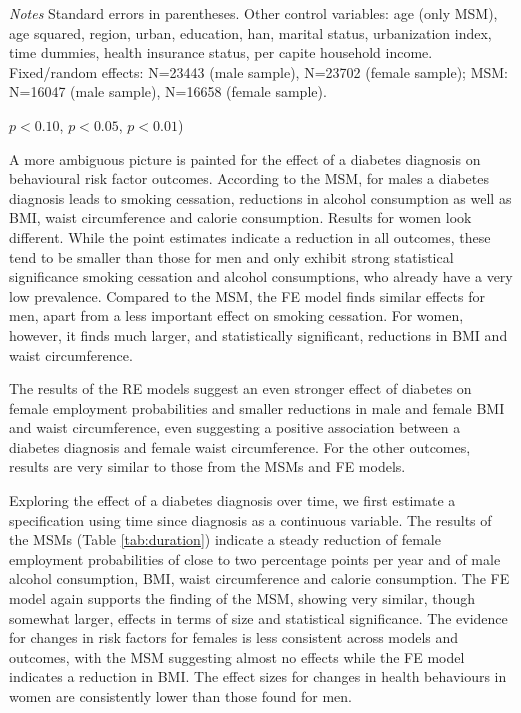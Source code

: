 \begin{table}[p]
\begin{adjustbox}{max width=\linewidth, center}
\begin{threeparttable}
{\begin{tabular}{l*{6}{S
S}}
\bottomrule
\end{tabular}
\begin{tablenotes}
\item \textit{Notes} Standard errors in parentheses. Other control variables: age (only MSM), age squared, region, urban, education, han, marital status, urbanization index, time dummies, health insurance status, per capite household income.  Fixed/random effects: N=23443 (male sample), N=23702 (female sample); MSM:  N=16047 (male sample), N=16658 (female sample).
\item \sym{*} \(p<0.10\), \sym{**} \(p<0.05\), \sym{***} \(p<0.01\))
\end{tablenotes}
}
\end{threeparttable}
\end{adjustbox}

\end{table}

A more ambiguous picture is painted for the effect of a diabetes diagnosis on behavioural risk factor outcomes. According to the \ac{MSM}, for males a diabetes diagnosis leads to smoking cessation, reductions in alcohol consumption as well as \ac{BMI}, waist circumference and calorie consumption. Results for women look different. While the point estimates indicate a reduction in all outcomes, these tend to be smaller than those for men and only exhibit strong statistical significance smoking cessation and alcohol consumptions, who already have a very low prevalence. Compared to the \ac{MSM}, the \ac{FE} model finds similar effects for men, apart from a less important effect on smoking cessation.	For women, however, it finds much larger, and statistically significant, reductions in \ac{BMI} and waist circumference. 

The results of the \ac{RE} models suggest an even stronger effect of diabetes on female employment probabilities and  smaller reductions in male and female \ac{BMI} and waist circumference, even suggesting a positive association between a diabetes diagnosis and female waist circumference. For the other outcomes, results are very similar to those from the \acp{MSM} and \ac{FE} models.

Exploring the effect of a diabetes diagnosis over time, we first estimate a specification using time since diagnosis as a continuous variable. The results of the \acp{MSM} (Table \ref{tab:duration}) indicate a steady reduction of female employment probabilities of close to two percentage points per year and of male alcohol consumption, \ac{BMI}, waist circumference and calorie consumption. The \ac{FE} model again supports the finding of the \ac{MSM}, showing very similar, though somewhat larger, effects in terms of size and statistical significance. The evidence for changes in risk factors for females is less consistent across models and outcomes, with the \ac{MSM} suggesting almost no effects while the \ac{FE} model indicates a reduction in \ac{BMI}. The effect sizes for changes in health behaviours in women are consistently lower than those found for men. 

